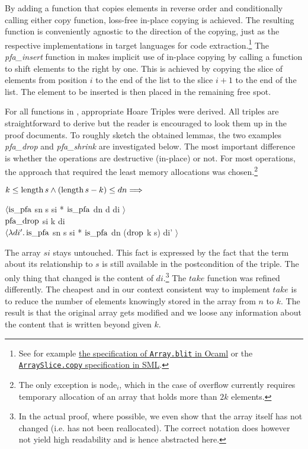 By adding a function that copies elements in reverse order
and conditionally calling either copy function,
loss-free in-place copying is achieved.
The resulting function is conveniently agnostic to the direction
of the copying, just as the respective implementations
in target languages for code extraction.\footnote{
    See for example \href{https://caml.inria.fr/pub/docs/manual-ocaml/libref/Array.html}{the specification of \texttt{Array.blit} in Ocaml} or
    the \href{https://smlfamily.github.io/Basis/array-slice.html\#SIG:ARRAY_SLICE.copy:VAL}{\texttt{ArraySlice.copy} specification in SML}.
}
The \textit{pfa\_insert} function in  makes
implicit use of in-place copying by calling a function to shift elements
to the right by one.
This is achieved by copying the slice of elements
from position $i$ to the end of the list
to the slice $i+1$ to the end of the list.
The element to be inserted is then placed in the remaining free spot.

For all functions in ,
appropriate Hoare Triples were derived.
All triples are straightforward to derive but the reader is encouraged
to look them up in the proof documents.
To roughly sketch the obtained lemmas, the two examples
\textit{pfa\_drop} and \textit{pfa\_shrink} are investigated below.
The most important difference is whether
the operations are destructive (in-place) or not.
For most operations, the approach that required the least
memory allocations was chosen.\footnote{
    The only exception is node$_i$, which in the case of overflow
    currently requires temporary allocation of an array that holds more than $2k$ elements.
}

\begin{lemma}
    $k \le \operatorname{length} s \wedge (\operatorname{length} s - k) \le dn \Longrightarrow$ \\
    \begin{center}
    $\langle \operatorname{is\_pfa}$ sn s si * $\operatorname{is\_pfa}$ dn d di $\rangle$ \\
    $\operatorname{pfa\_drop}$ si k di \\
    $\langle\lambda di'. \operatorname{is\_pfa}$ sn s si * $\operatorname{is\_pfa}$ dn ($\operatorname{drop}$ k s) di' $\rangle$
    \end{center}
\end{lemma}

The array $si$ stays untouched.
This fact is expressed by the fact that the term about its relationship to $s$
is still available in the postcondition of the triple.
The only thing that changed is the content of $di$.\footnote{
    In the actual proof, where possible, we even show that the array itself has not changed
    (i.e. has not been reallocated).
    The correct notation does however not yield high readability
    and is hence abstracted here.
}
The $take$ function was refined differently.
The cheapest and in our context consistent way to
implement $take$ is to
reduce the number of elements knowingly stored in the array
from $n$ to $k$.
The result is that the original array gets modified and we loose any information
about the content that is written beyond given $k$.

